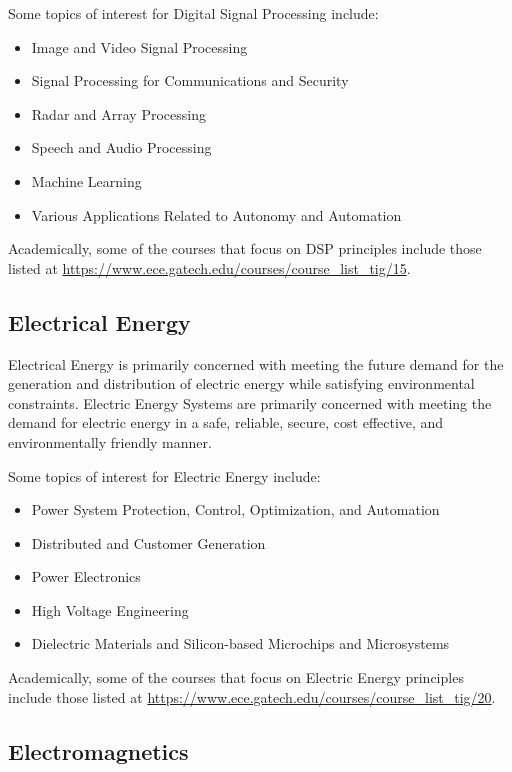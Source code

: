 \documentclass[12pt]{article}
\begin{document}
Some topics of interest for Digital Signal Processing include:

\begin{itemize}
    \item Image and Video Signal Processing
    \item Signal Processing for Communications and Security
    \item Radar and Array Processing
    \item Speech and Audio Processing
    \item Machine Learning
    \item Various Applications Related to Autonomy and Automation
\end{itemize}

Academically, some of the courses that focus on DSP principles include those listed at \url{https://www.ece.gatech.edu/courses/course_list_tig/15}.

\subsection{Electrical Energy}

Electrical Energy is primarily concerned with meeting the future demand for the generation and distribution of electric energy while satisfying environmental constraints. Electric Energy Systems are primarily concerned with meeting the demand for electric energy in a safe, reliable, secure, cost effective, and environmentally friendly manner.

Some topics of interest for Electric Energy include:

\begin{itemize}
    \item Power System Protection, Control, Optimization, and Automation
    \item Distributed and Customer Generation
    \item Power Electronics
    \item High Voltage Engineering
    \item Dielectric Materials and Silicon-based Microchips and Microsystems
\end{itemize}

Academically, some of the courses that focus on Electric Energy principles include those listed at \url{https://www.ece.gatech.edu/courses/course_list_tig/20}.

\subsection{Electromagnetics}
\end{document}
